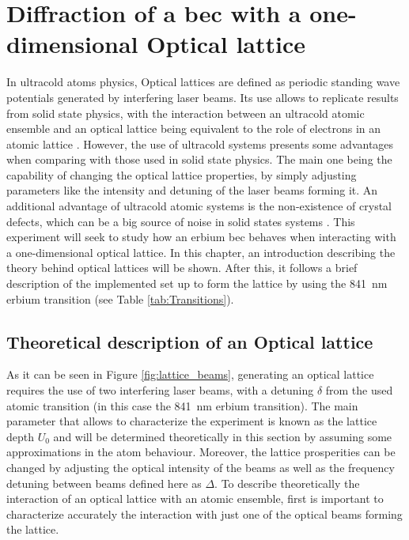 
\chapter{Diffraction of a \acl{bec} with a one-dimensional Optical lattice}
\label{chap:one_dimensional_lattices}
In ultracold atoms physics, Optical lattices are defined as periodic standing wave potentials generated by interfering laser beams. Its use allows to replicate results from solid state physics, with the interaction between an ultracold atomic ensemble and an optical lattice being equivalent to the role of electrons in an atomic lattice \cite{Lewenstein2007, Bloch2008}.  However, the use of ultracold systems presents some advantages when comparing with those used in solid state physics. The main one being the capability of changing the optical lattice properties, by simply adjusting parameters like the intensity and detuning of the laser beams forming it. An additional advantage of ultracold atomic systems is the non-existence of crystal defects, which can be a big source of noise in solid states systems \cite{VanDerZiel1978}. This experiment will seek to study how an erbium \ac{bec} behaves when interacting with a one-dimensional optical lattice. In this chapter, an introduction describing the theory behind optical lattices will be shown. After this, it follows a brief description of the implemented set up to form the lattice by using the \SI{841}{\nano\meter} erbium transition (see Table \ref{tab:Transitions}).


\section{Theoretical description of an Optical lattice}

As it can be seen in Figure \ref{fig:lattice_beams}, generating an optical lattice requires the use of two interfering laser beams, with a detuning $\delta$ from the used atomic transition (in this case the \SI{841}{\nano\meter} erbium transition). The main parameter that allows to characterize the experiment is known as the lattice depth $U_0$ and will be determined theoretically in this section by assuming some approximations in the atom behaviour. Moreover, the lattice prosperities can be changed by adjusting the optical intensity of the beams as well as the frequency detuning between beams defined here as $\Delta$. To describe theoretically the interaction of an optical lattice with an atomic ensemble, first is important to characterize accurately the interaction with just one of the optical beams forming the lattice.

